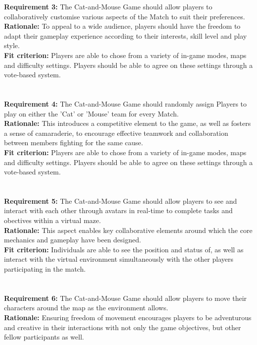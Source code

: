 \documentclass[12pt, titlepage]{article}
\begin{document}
\textbf{Requirement 3:}  The Cat-and-Mouse Game should allow players to collaboratively customise various aspects of the Match to suit their preferences.\\
\textbf{Rationale:}  To appeal to a wide audience, players should have the freedom to adapt their gameplay experience according to their interests, skill level and play style.\\
\textbf{Fit criterion:}  Players are able to chose from a variety of in-game modes, maps and difficulty settings. Players should be able to agree on these settings through a vote-based system.\\
\\\\
\textbf{Requirement 4:}  The Cat-and-Mouse Game should randomly assign Players to play on either the 'Cat' or 'Mouse' team for every Match.\\
\textbf{Rationale:}  This introduces a competitive element to the game, as well as fosters a sense of camaraderie, to encourage effective teamwork and collaboration between members fighting for the same cause. \\
\textbf{Fit criterion:}  Players are able to chose from a variety of in-game modes, maps and difficulty settings. Players should be able to agree on these settings through a vote-based system.\\
\\\\
\textbf{Requirement 5:}  The Cat-and-Mouse Game should allow players to see and interact with each other through avatars in real-time to complete tasks and obectives within a virtual maze. \\
\textbf{Rationale:}  This aspect enables key collaborative elements around which the core mechanics and gameplay have been designed.\\
\textbf{Fit criterion:}  Individuals are able to see the position and status of, as well as interact with the virtual environment simultaneously with the other players participating in the match.\\
\\\\
\textbf{Requirement 6:}  The Cat-and-Mouse Game should allow players to move their characters around the map as the environment allows. \\
\textbf{Rationale:}  Ensuring freedom of movement encourages players to be adventurous and creative in their interactions with not only the game objectives, but other fellow participants as well.\\
\end{document}
